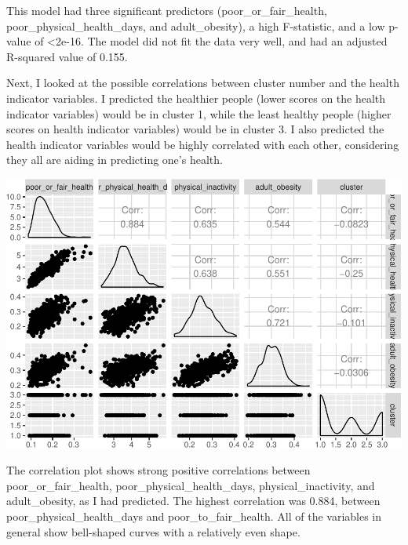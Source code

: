 \documentclass[12pt,twoside]{amherstthesis}
\begin{document}
  This model had three significant predictors (poor\_or\_fair\_health,
  poor\_physical\_health\_days, and adult\_obesity), a high F-statistic,
  and a low p-value of \textless{}2e-16. The model did not fit the data
  very well, and had an adjusted R-squared value of 0.155.
  
  Next, I looked at the possible correlations between cluster number and
  the health indicator variables. I predicted the healthier people (lower
  scores on the health indicator variables) would be in cluster 1, while
  the least healthy people (higher scores on health indicator variables)
  would be in cluster 3. I also predicted the health indicator variables
  would be highly correlated with each other, considering they all are
  aiding in predicting one's health.
  
  \begin{Shaded}
  \begin{Highlighting}[]
  \end{Highlighting}
  \end{Shaded}
  
  \begin{center}\includegraphics{Comps_Proj_files/figure-latex/unnamed-chunk-16-1} \end{center}
  
  The correlation plot shows strong positive correlations between
  poor\_or\_fair\_health, poor\_physical\_health\_days,
  physical\_inactivity, and adult\_obesity, as I had predicted. The
  highest correlation was 0.884, between poor\_physical\_health\_days and
  poor\_to\_fair\_health. All of the variables in general show bell-shaped
  curves with a relatively even shape.
  
\end{document}
